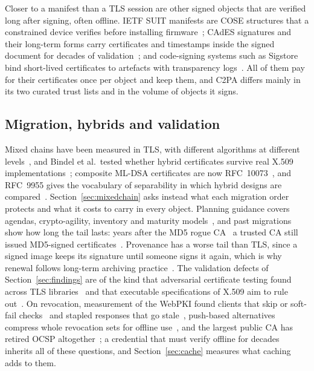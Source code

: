 Closer to a manifest than a TLS session are other signed objects that are
verified long after signing, often offline. IETF SUIT manifests are COSE
structures that a constrained device verifies before installing
firmware~\cite{rfc9019,rfc9124}; CAdES signatures and their long-term forms
carry certificates and timestamps inside the signed document for decades of
validation~\cite{etsi319122,etsi319102}; and code-signing systems such as
Sigstore bind short-lived certificates to artefacts with transparency
logs~\cite{newman2022sigstore}. All of them pay for their certificates once per
object and keep them, and C2PA differs mainly in its two curated trust lists
and in the volume of objects it signs.

\subsection{Migration, hybrids and validation}
\label{sec:related-migration}

Mixed chains have been measured in TLS, with different algorithms at
different levels~\cite{sikeridis2020ndss,paul2022}, and Bindel et al.\ tested
whether hybrid certificates survive real X.509 implementations~\cite{%
bindel2017}; composite ML-DSA certificates are now RFC~10073~\cite{%
ounsworth2026composite}, and RFC~9955 gives the vocabulary of separability
in which hybrid designs are compared~\cite{rfc9955}.
Section~\ref{sec:mixedchain} asks instead what each migration order protects
and what it costs to carry in every object. Planning guidance covers agendas,
crypto-agility, inventory and maturity
models~\cite{ott2019,nist_cswp39,nist_sp1800_38,hohm2023}, and past
migrations show how long the tail lasts: years after the MD5 rogue
CA~\cite{stevens2009} a trusted CA still issued MD5-signed
certificates~\cite{durumeric2013}. Provenance has a worse tail than TLS, since
a signed image keeps its signature until someone signs it again, which is why
renewal follows long-term archiving practice~\cite{rfc4998,etsi319102,%
vigil2015survey,haber1991}. The validation defects of
Section~\ref{sec:findings} are of the kind that adversarial certificate
testing found across TLS libraries~\cite{brubaker2014frankencerts} and that
executable specifications of X.509 aim to rule out~\cite{debnath2021ceres}.
On revocation, measurement of the WebPKI found clients that skip or
soft-fail checks~\cite{liu2015revocation} and stapled responses that go
stale~\cite{chung2018muststaple}, push-based alternatives compress whole
revocation sets for offline use~\cite{larisch2017crlite}, and the largest
public CA has retired OCSP altogether~\cite{aas2025ocsp}; a credential that
must verify offline for decades inherits all of these questions, and
Section~\ref{sec:cache} measures what caching adds to them.

